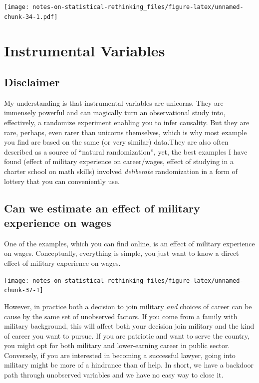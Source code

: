 \documentclass[
]{book}
\begin{document}
\texttt{[image: notes-on-statistical-rethinking\_files/figure-latex/unnamed-chunk-34-1.pdf]}

\hypertarget{instrumental-variables}{%
\chapter{Instrumental Variables}\label{instrumental-variables}}

\hypertarget{disclaimer}{%
\section*{Disclaimer}\label{disclaimer}}

My understanding is that instrumental variables are unicorns. They are immensely powerful and can magically turn an observational study into, effectively, a randomize experiment enabling you to infer causality. But they are rare, perhaps, even rarer than unicorns themselves, which is why most example you find are based on the same (or very similar) data.They are also often described as a source of ``natural randomization'', yet, the best examples I have found (effect of military experience on career/wages, effect of studying in a charter school on math skills) involved \emph{deliberate} randomization in a form of lottery that you can conveniently use.

\hypertarget{can-we-estimate-an-effect-of-military-experience-on-wages}{%
\section*{Can we estimate an effect of military experience on wages}\label{can-we-estimate-an-effect-of-military-experience-on-wages}}

One of the examples, which you can find online, is an effect of military experience on wages. Conceptually, everything is simple, you just want to know a direct effect of military experience on wages.

\begin{center}\texttt{[image: notes-on-statistical-rethinking\_files/figure-latex/unnamed-chunk-37-1]} \end{center}

However, in practice both a decision to join military \emph{and} choices of career can be cause by the same set of unobserved factors. If you come from a family with military background, this will affect both your decision join military and the kind of career you want to pursue. If you are patriotic and want to serve the country, you might opt for both military and lower-earning career in public sector. Conversely, if you are interested in becoming a successful lawyer, going into military might be more of a hindrance than of help. In short, we have a backdoor path through unobserved variables and we have no easy way to close it.
\end{document}

